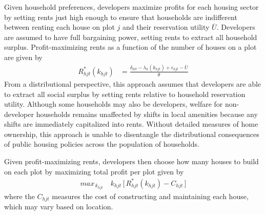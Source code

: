 \documentclass[12pt]{article}
\begin{document}
Given household preferences, developers maximize profits for each housing sector by setting rents just high enough to ensure that households are indifferent between renting each house on plot $j$ and their reservation utility $\overline{U}$.  Developers are assumed to have full bargaining power, setting rents to extract all household surplus.  Profit-maximizing rents as a function of the number of houses on a plot are given by
\begin{align}
\label{eq:rent}
R_{hjt}^{*}(k_{hjt}) &= \frac{ \delta_{hlt} - \lambda_{h}(k_{hjt}) + \epsilon_{hjt} - \overline{U}}{\theta}
\end{align}
From a distributional perspective, this approach assumes that developers are able to extract all social surplus by setting rents relative to household reservation utility.  Although some households may also be developers, welfare for non-developer households remains unaffected by shifts in local amenities because any shifts are immediately capitalized into rents.  Without detailed measures of home ownership, this approach is unable to disentangle the distributional consequences of public housing policies across the population of households.

Given profit-maximizing rents, developers then choose how many houses to build on each plot by maximizing total profit per plot given by
\begin{align*}
max_{\,k_{hjt}} \,\,\,\,\,\,  k_{hjt} \, \Big[ \, R_{hjt}^{*}(k_{hjt}) - C_{hjt} \, \Big ]
\end{align*}
\noindent where the $C_{hjt}$ measures the cost of constructing and maintaining each house, which may vary based on location.

\end{document}
